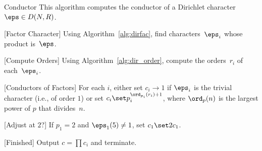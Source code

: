 \begin{algorithm}{Conductor}\label{alg:conductor}
  This algorithm computes the conductor of a Dirichlet
  character~$\eps \in D(N,R)$.
\begin{steps}
\item{}[Factor Character]\label{step:factor_dir} Using Algorithm~\ref{alg:dirfac}, find
  characters~$\eps_i$ whose product is~$\eps$.
\item{}[Compute Orders] Using Algorithm~\ref{alg:dir_order}, compute
  the orders~$r_i$ of each~$\eps_i$.
\item{}[Conductors of Factors]\label{step:cond_fac}
For each $i$, either set $c_i\to 1$ if $\eps_i$
is the trivial character (i.e., of order $1$) or set $c_i \set
  p_i^{\ord_{p_i}(r_i)+1}$, where $\ord_{p}(n)$ is the largest power
  of $p$ that divides~$n$.
\item{}[Adjust at $2$?] If $p_1=2$ and $\eps_1(5)\neq 1$, set
$c_1\set 2c_1$.  
\item{}[Finished] Output $c = \prod c_i$ and terminate.
\end{steps}
\end{algorithm}
